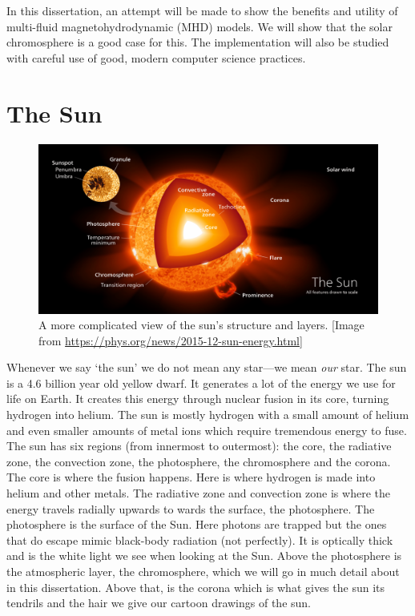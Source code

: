 \documentclass[12pt,upcase]{umlthesis}
\begin{document}
In this dissertation, an attempt will be made to show the benefits and utility of multi-fluid magnetohydrodynamic (MHD) models. We will show that the solar chromosphere is a good case for this. The implementation will also be studied with careful use of good, modern computer science practices.

\section{The Sun}
\begin{figure}[h!]\label{fig:sunstructure}
	\centering
	\includegraphics[width=1.0\linewidth]{images/sunstructure.png}
	\caption{A more complicated view of the sun's structure and layers. [{Image from \url{https://phys.org/news/2015-12-sun-energy.html}}]} %
\end{figure}
Whenever we say `the sun' we do not mean any star---we mean \textit{our} star. The sun is a 4.6 billion year old yellow dwarf. It generates a lot of the energy we use for life on Earth. It creates this energy through nuclear fusion in its core, turning hydrogen into helium. The sun is mostly hydrogen with a small amount of helium and even smaller amounts of metal ions which require tremendous energy to fuse. The sun has six regions (from innermost to outermost): the core, the radiative zone, the convection zone, the photosphere, the chromosphere and the corona. The core is where the fusion happens. Here is where hydrogen is made into helium and other metals. The radiative zone and convection zone is where the energy travels radially upwards to wards the surface, the photosphere. The photosphere is the surface of the Sun. Here photons are trapped but the ones that do escape mimic black-body radiation (not perfectly). It is optically thick and is the white light we see when looking at the Sun. Above the photosphere is the atmospheric layer, the chromosphere, which we will go in much detail about in this dissertation. Above that, is the corona which is what gives the sun its tendrils and the hair we give our cartoon drawings of the sun.
\end{document}
